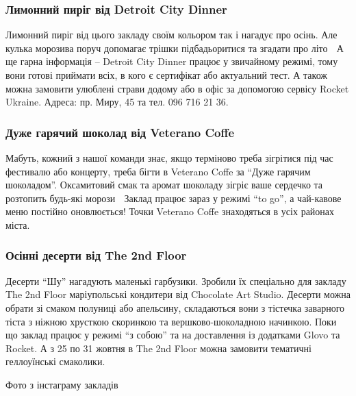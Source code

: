 \subsubsection{Лимонний пиріг від Detroit City Dinner}


Лимонний пиріг від цього закладу своїм кольором так і нагадує про осінь. Але
кулька морозива поруч допомагає трішки підбадьоритися та згадати про літо 🙂 А
ще гарна інформація – Detroit City Dinner працює у звичайному режимі, тому вони
готові приймати всіх, в кого є сертифікат або актуальний тест. А також можна
замовити улюблені страви додому або в офіс за допомогою сервісу Rocket Ukraine.
Адреса: пр. Миру, 45 та тел. 096 716 21 36.

\subsubsection{Дуже гарячий шоколад від Veterano Coffe}


Мабуть, кожний з нашої команди знає, якщо терміново треба зігрітися під час
фестивалю або концерту, треба бігти в Veterano Coffe за \enquote{Дуже гарячим
шоколадом}. Оксамитовий смак та аромат шоколаду зігріє ваше сердечко та
розтопить будь-які морози 🙂 Заклад працює зараз у режимі \enquote{to go}, а чай-кавове
меню постійно оновлюється! Точки Veterano Coffe знаходяться в усіх районах
міста.

\subsubsection{Осінні десерти від The 2nd Floor}


Десерти \enquote{Шу} нагадують маленькі гарбузики. Зробили їх спеціально для закладу
The 2nd Floor маріупольські кондитери від Chocolate Art Studio. Десерти можна
обрати зі смаком полуниці або апельсину, складаються вони з тістечка заварного
тіста з ніжною хрусткою скоринкою та вершково-шоколадною начинкою. Поки що
заклад працює у режимі \enquote{з собою} та на доставлення із додатками Glovo та
Rocket. А з 25 по 31 жовтня в The 2nd Floor можна замовити тематичні
геллоуїнські смаколики.

Фото з інстаграму закладів
